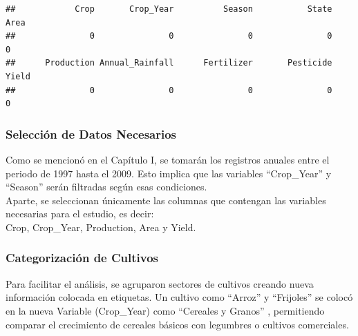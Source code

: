 \documentclass[oneside,11pt]{Latex/Classes/PhDthesisPSnPDF}
\begin{document}
\begin{verbatim}
##            Crop       Crop_Year          Season           State            Area 
##               0               0               0               0               0 
##      Production Annual_Rainfall      Fertilizer       Pesticide           Yield 
##               0               0               0               0               0
\end{verbatim}

\subsubsection{Selección de Datos Necesarios}

Como se mencionó en el Capítulo I, se tomarán los registros anuales
entre el periodo de 1997 hasta el 2009. Esto implica que las variables
``Crop\_Year'' y ``Season'' serán filtradas según esas condiciones.\\

Aparte, se seleccionan únicamente las columnas que contengan las
variables necesarias para el estudio, es decir:\\

Crop, Crop\_Year, Production, Area y Yield.\\

\subsubsection{Categorización de Cultivos}

Para facilitar el análisis, se agruparon sectores de cultivos creando
nueva información colocada en etiquetas. Un cultivo como ``Arroz'' y
``Frijoles'' se colocó en la nueva Variable (Crop\_Year) como ``Cereales
y Granos'' , permitiendo comparar el crecimiento de cereales básicos con
legumbres o cultivos comerciales.\\
\end{document}
